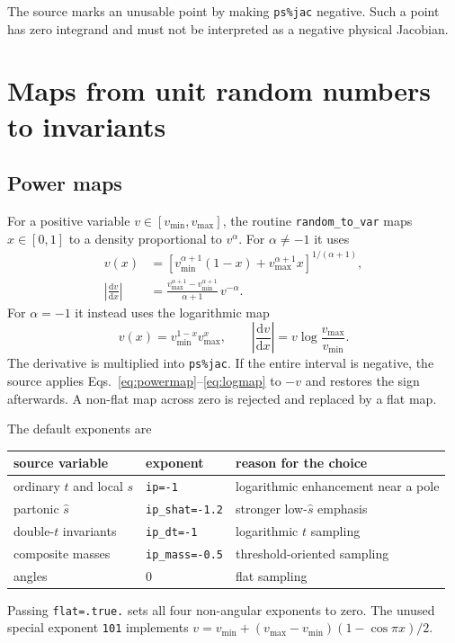 \documentclass[11pt,a4paper]{article}
\newcommand{\shat}{\hat{s}}
\newcommand{\dd}{\mathrm{d}}
\newcommand{\code}[1]{\texttt{#1}}
\begin{document}
The source marks an unusable point by making \code{ps\%jac} negative.  Such a
point has zero integrand and must not be interpreted as a negative physical
Jacobian.

\section{Maps from unit random numbers to invariants}

\subsection{Power maps}

For a positive variable $v\in[v_{\min},v_{\max}]$, the routine
\code{random\_to\_var} maps $x\in[0,1]$ to a density proportional to
$v^\alpha$.  For $\alpha\ne-1$ it uses
\begin{align}
 v(x)&=\left[v_{\min}^{\alpha+1}(1-x)+v_{\max}^{\alpha+1}x\right]^{1/(\alpha+1)},
 \label{eq:powermap}\\
 \left|\frac{\dd v}{\dd x}\right|&=
 \frac{v_{\max}^{\alpha+1}-v_{\min}^{\alpha+1}}{\alpha+1}\,v^{-\alpha}.
 \label{eq:powerjac}
\end{align}
For $\alpha=-1$ it instead uses the logarithmic map
\begin{equation}
 v(x)=v_{\min}^{1-x}v_{\max}^{x},\qquad
 \left|\frac{\dd v}{\dd x}\right|=v\log\frac{v_{\max}}{v_{\min}}.
 \label{eq:logmap}
\end{equation}
The derivative is multiplied into \code{ps\%jac}.  If the entire interval is
negative, the source applies Eqs.~\eqref{eq:powermap}--\eqref{eq:logmap} to
$-v$ and restores the sign afterwards.  A non-flat map across zero is rejected
and replaced by a flat map.

The default exponents are
\begin{center}
\begin{tabular}{lll}
\toprule
source variable & exponent & reason for the choice\\
\midrule
ordinary $t$ and local $s$ & \code{ip=-1} & logarithmic enhancement near a pole\\
partonic $\shat$ & \code{ip\_shat=-1.2} & stronger low-$\shat$ emphasis\\
double-$t$ invariants & \code{ip\_dt=-1} & logarithmic $t$ sampling\\
composite masses & \code{ip\_mass=-0.5} & threshold-oriented sampling\\
angles & $0$ & flat sampling\\
\bottomrule
\end{tabular}
\end{center}
Passing \code{flat=.true.} sets all four non-angular exponents to zero.  The
unused special exponent \code{101} implements
$v=v_{\min}+(v_{\max}-v_{\min})(1-\cos\pi x)/2$.
\end{document}
